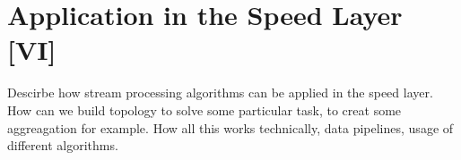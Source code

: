 \section{Application in the Speed Layer [VI]}

Descirbe how stream processing algorithms can be applied in the speed layer.
How can we build topology to solve some particular task, to creat some aggreagation for example.
How all this works technically, data pipelines, usage of different algorithms.